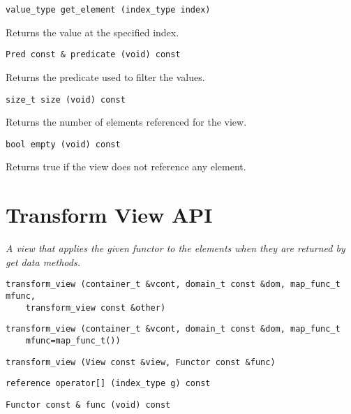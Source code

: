 \begin{verbatim}
value_type get_element (index_type index)
\end{verbatim}

Returns the value at the specified index.

\begin{verbatim}
Pred const & predicate (void) const
\end{verbatim}

Returns the predicate used to filter the values.

\begin{verbatim}
size_t size (void) const
\end{verbatim}

Returns the number of elements referenced for the view.

\begin{verbatim}
bool empty (void) const
\end{verbatim}

Returns true if the view does not reference any element.

\section{Transform View API } \label{sec-trans-vw}

\emph{ A view that applies the given functor to the elements when they are returned by get data methods. }

\begin{verbatim}
transform_view (container_t &vcont, domain_t const &dom, map_func_t mfunc,
    transform_view const &other)
\end{verbatim}

\begin{verbatim}
transform_view (container_t &vcont, domain_t const &dom, map_func_t
    mfunc=map_func_t())
\end{verbatim}

\begin{verbatim}
transform_view (View const &view, Functor const &func)
\end{verbatim}

\begin{verbatim}
reference operator[] (index_type g) const
\end{verbatim}

\begin{verbatim}
Functor const & func (void) const
\end{verbatim}

